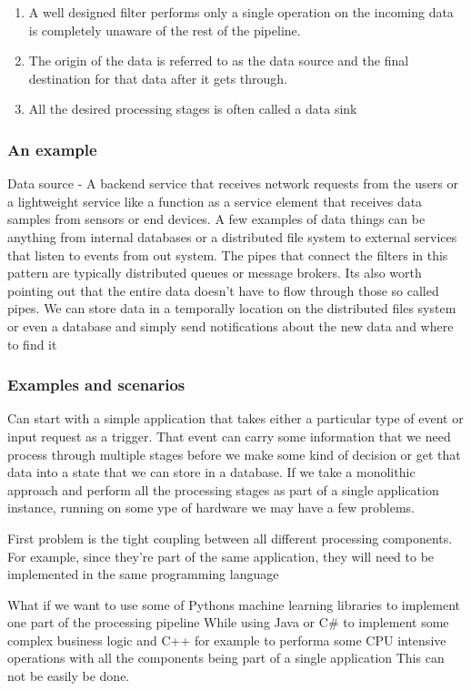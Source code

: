 \begin{enumerate}
    \item  A well designed filter performs only a single operation on the incoming data is completely unaware of the rest of the pipeline.
    \item  The origin of the data is referred to as the data source and the final destination for that data after it gets through.
    \item  All the desired processing stages is often called a data sink
\end{enumerate}

\subsubsection{An example}
Data source - A backend service that receives network requests from the users or a lightweight service like a function as a service element that receives data samples from sensors or end devices.
A few examples of data things can be anything from internal databases or a distributed file system to external services that listen to events from out system.
The pipes that connect the filters in this pattern are typically distributed queues or message brokers.
Its also worth pointing out that the entire data doesn't have to flow through those so called pipes.
We can store data in a temporally location on the distributed files system or even a database and simply send notifications about the new data and where to find it

\subsubsection{Examples and scenarios}
Can start with a simple application that takes either a particular type of event or input request as a trigger.
That event can carry some information that we need process through multiple stages before we make some kind of decision or get that data into a state that we can store in a database.
If we take a monolithic approach and perform all the processing stages as part of a single application instance, running on some ype of hardware we may have a few problems.

First problem is the tight coupling between all different processing components.
For example, since they're part of the same application, they will need to be implemented in the same programming language

What if we want to use some of Pythons machine learning libraries to implement one part of the processing pipeline
While using Java or C\# to implement some complex business logic and C++ for example to performa some CPU intensive operations with all the components being part of a single application
This can not be easily be done.

